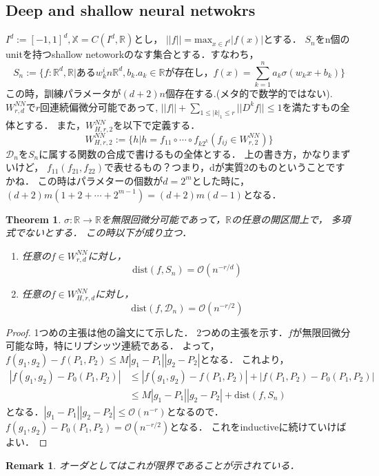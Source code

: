 \documentclass{ujarticle}
\newtheorem{thm}{Theorem}[section]
\newtheorem*{rem}{Remark}
\begin{document}
\subsection{Deep and shallow neural netwokrs}
\label{sub:Deep and shallow neural netwokrs}
$I^d:=[-1,1]^d,\mathbb{X}=C(I^d,\mathbb{R})$とし，
$||f||=\mathrm{max}_{x \in I^d}|f(x)|$とする．
$S_n$をn個のunitを持つshallow netoworkのなす集合とする．すなわち，
\begin{equation*}
 S_n:=\{f:\mathbb{R}^d,\mathbb{R}|\mbox{ある}w_k ^in \mathbb{R}^d,b_k.a_k \in \mathbb{R}\mbox{が存在し，}f(x)=\sum_{k=1}^na_k \sigma(w_kx+b_k) \}
\end{equation*}
この時，訓練パラメータが$(d+2)n$個存在する.(メタ的で数学的ではない).
$W_{r,d}^{NN}$で$r$回連続偏微分可能であって,
$||f||+\sum_{1 \le |k|_1 \le r}||D^kf|| \le 1$を満たすもの全体とする．
また，$W_{H,r,2}^{NN}$を以下で定義する．
\begin{equation*}
  W_{H,r,2}^{NN}:=\{h | h=f_{11} \circ \cdots \circ f_{k2^k} (f_{ij} \in W_{r,2}^{NN})\}
\end{equation*}
$\mathcal{D}_n$を$S_n$に属する関数の合成で書けるもの全体とする．
上の書き方，かなりまずいけど， $f_11(f_21,f_22)$で表せるもの？つまり，dが実質2のものということですかね．
この時はパラメターの個数が$d=2^m$とした時に，$(d+2)m(1 + 2 + \cdots +2^{m-1})=(d+2)m(d-1)$となる．
\begin{thm}
 $\sigma :\mathbb{R} \to \mathbb{R}$を無限回微分可能であって，$\mathbb{R}$の任意の開区間上で，
 多項式でないとする． この時以下が成り立つ．
 \begin{enumerate}
   \item 任意の$f \in W_{r,d}^{NN}$に対し，
   \begin{equation}
     \mathrm{dist}(f,S_n)= \mathcal{O}(n^{-r/d})
   \end{equation}
   \item 任意の$f \in W_{H,r,d}^{NN}$に対し，
   \begin{equation}
     \mathrm{dist}(f,\mathcal{D}_n)=\mathcal{O}(n^{-r/2})
   \end{equation}
 \end{enumerate}
\end{thm}
\begin{proof}
  1つめの主張は他の論文にて示した．
  2つめの主張を示す．$f$が無限回微分可能な時，特にリプシッツ連続である．
  よって，$f(g_1,g_2)-f(P_1,P_2) \le M|g_1 - P_1||g_2 - P_2|$となる．
  これより，
  \begin{align*}
    |f(g_1,g_2)-P_0(P_1,P_2) |  & \le |f(g_1,g_2) - f(P_1,P_2)| +|  f(P_1,P_2) -P_0(P_1,P_2) | \\
    & \le M|g_1 - P_1||g_2 - P_2| +\mathrm{dist}(f,S_n)
  \end{align*}
となる．$|g_1 - P_1||g_2 - P_2|\le \mathcal{O}(n^{-r})$となるので．$f(g_1,g_2)-P_0(P_1,P_2) =\mathcal{O}(n^{-r/2})$となる．
これをinductiveに続けていけばよい．
\end{proof}
\begin{rem}
オーダとしてはこれが限界であることが示されている．
\end{rem}
\end{document}

